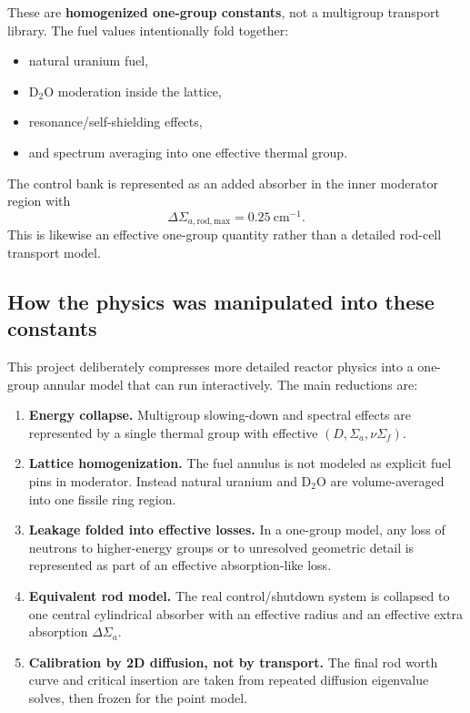 \documentclass[11pt]{article}
\begin{document}
These are \textbf{homogenized one-group constants}, not a multigroup transport
library.  The fuel values intentionally fold together:
\begin{itemize}
  \item natural uranium fuel,
  \item D$_2$O moderation inside the lattice,
  \item resonance/self-shielding effects,
  \item and spectrum averaging into one effective thermal group.
\end{itemize}

The control bank is represented as an added absorber in the inner moderator
region with
\[
\Delta \Sigma_{a,\mathrm{rod,max}} = 0.25\ \mathrm{cm}^{-1}.
\]
This is likewise an effective one-group quantity rather than a detailed rod-cell
transport model.

\subsection{How the physics was manipulated into these constants}

This project deliberately compresses more detailed reactor physics into a
one-group annular model that can run interactively.  The main reductions are:
\begin{enumerate}
  \item \textbf{Energy collapse.}  Multigroup slowing-down and spectral effects
        are represented by a single thermal group with effective
        $(D,\Sigma_a,\nu\Sigma_f)$.
  \item \textbf{Lattice homogenization.}  The fuel annulus is not modeled as
        explicit fuel pins in moderator.  Instead natural uranium and D$_2$O are
        volume-averaged into one fissile ring region.
  \item \textbf{Leakage folded into effective losses.}  In a one-group model,
        any loss of neutrons to higher-energy groups or to unresolved geometric
        detail is represented as part of an effective absorption-like loss.
  \item \textbf{Equivalent rod model.}  The real control/shutdown system is
        collapsed to one central cylindrical absorber with an effective radius
        and an effective extra absorption $\Delta\Sigma_a$.
  \item \textbf{Calibration by 2D diffusion, not by transport.}  The final rod
        worth curve and critical insertion are taken from repeated diffusion
        eigenvalue solves, then frozen for the point model.
\end{enumerate}
\end{document}
